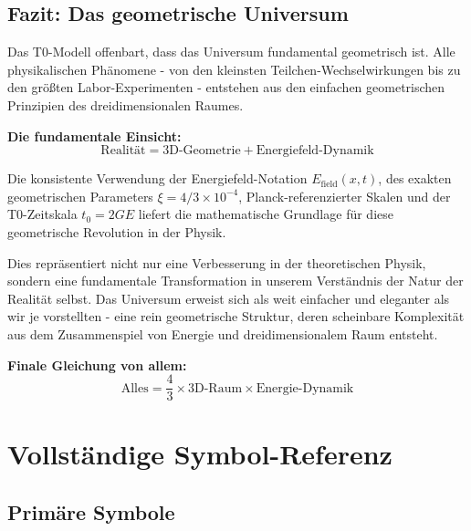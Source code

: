 \documentclass[12pt,a4paper]{report}
\begin{document}
	\section{Fazit: Das geometrische Universum}
	\label{sec:conclusion_geometric_universe}
	
	Das T0-Modell offenbart, dass das Universum fundamental geometrisch ist. Alle physikalischen Phänomene - von den kleinsten Teilchen-Wechselwirkungen bis zu den größten Labor-Experimenten - entstehen aus den einfachen geometrischen Prinzipien des dreidimensionalen Raumes.
	
	\textbf{Die fundamentale Einsicht:}
	\begin{equation}
		\text{Realität} = \text{3D-Geometrie} + \text{Energiefeld-Dynamik}
	\end{equation}
	
	Die konsistente Verwendung der Energiefeld-Notation $E_{\text{field}}(x,t)$, des exakten geometrischen Parameters $\xi = 4/3 \times 10^{-4}$, Planck-referenzierter Skalen und der T0-Zeitskala $t_0 = 2GE$ liefert die mathematische Grundlage für diese geometrische Revolution in der Physik.
	
	Dies repräsentiert nicht nur eine Verbesserung in der theoretischen Physik, sondern eine fundamentale Transformation in unserem Verständnis der Natur der Realität selbst. Das Universum erweist sich als weit einfacher und eleganter als wir je vorstellten - eine rein geometrische Struktur, deren scheinbare Komplexität aus dem Zusammenspiel von Energie und dreidimensionalem Raum entsteht.
	
	\textbf{Finale Gleichung von allem:}
	\begin{equation}
		\boxed{\text{Alles} = \frac{4}{3} \times \text{3D-Raum} \times \text{Energie-Dynamik}}
	\end{equation}
	
	\appendix
	\chapter{Vollständige Symbol-Referenz}
	\label{app:complete_symbols}
	
	\section{Primäre Symbole}
	\label{sec:primary_symbols}
	
\end{document}
